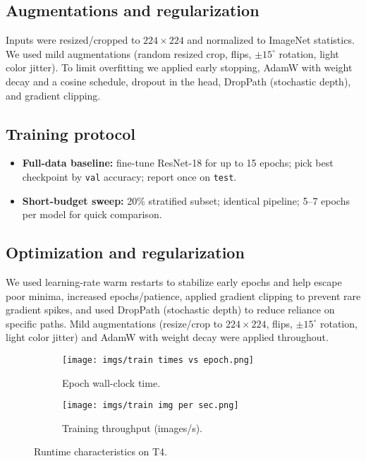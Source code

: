 \documentclass{article}
\begin{document}
\subsection{Augmentations and regularization}
Inputs were resized/cropped to $224\times224$ and normalized to ImageNet statistics. We used mild augmentations (random resized crop, flips, $\pm 15^\circ$ rotation, light color jitter). To limit overfitting we applied early stopping, AdamW with weight decay and a cosine schedule, dropout in the head, DropPath (stochastic depth), and gradient clipping.

\subsection{Training protocol}
\begin{itemize}[nosep,leftmargin=*]
  \item \textbf{Full-data baseline:} fine-tune ResNet-18 for up to 15 epochs; pick best checkpoint by \texttt{val} accuracy; report once on \texttt{test}.
  \item \textbf{Short-budget sweep:} 20\% stratified subset; identical pipeline; 5--7 epochs per model for quick comparison.
\end{itemize}

\subsection{Optimization and regularization}
We used learning-rate warm restarts to stabilize early epochs and help escape poor minima, increased epochs/patience, applied gradient clipping to prevent rare gradient spikes, and used DropPath (stochastic depth) to reduce reliance on specific paths. Mild augmentations (resize/crop to $224\times224$, flips, $\pm15^\circ$ rotation, light color jitter) and AdamW with weight decay were applied throughout.

\begin{figure}[H]
  \centering
  \begin{subfigure}{0.48\linewidth}
    \texttt{[image: imgs/train times vs epoch.png]}
    \caption{Epoch wall-clock time.}
  \end{subfigure}\hfill
  \begin{subfigure}{0.48\linewidth}
    \texttt{[image: imgs/train img per sec.png]}
    \caption{Training throughput (images/s).}
  \end{subfigure}
  \caption{Runtime characteristics on T4.}
\end{figure}
\end{document}
